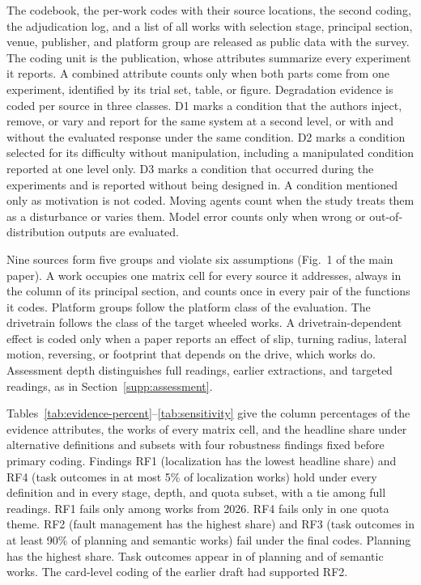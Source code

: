 \documentclass[journal]{IEEEtran}
\begin{document}
The codebook, the per-work codes with their source locations, the second coding, the adjudication log, and a list of all \CorpusCount{} works with selection stage, principal section, venue, publisher, and platform group are released as public data with the survey. The coding unit is the publication, whose attributes summarize every experiment it reports. A combined attribute counts only when both parts come from one experiment, identified by its trial set, table, or figure. Degradation evidence is coded per source in three classes. D1 marks a condition that the authors inject, remove, or vary and report for the same system at a second level, or with and without the evaluated response under the same condition. D2 marks a condition selected for its difficulty without manipulation, including a manipulated condition reported at one level only. D3 marks a condition that occurred during the experiments and is reported without being designed in. A condition mentioned only as motivation is not coded. Moving agents count when the study treats them as a disturbance or varies them. Model error counts only when wrong or out-of-distribution outputs are evaluated.

Nine sources form five groups and violate six assumptions (Fig.~1 of the main paper). A work occupies one matrix cell for every source it addresses, always in the column of its principal section, and counts once in every pair of the functions it codes. Platform groups follow the platform class of the evaluation. The drivetrain follows the class of the target wheeled works. A drivetrain-dependent effect is coded only when a paper reports an effect of slip, turning radius, lateral motion, reversing, or footprint that depends on the drive, which \DrivetrainEffectCount{} works do. Assessment depth distinguishes full readings, earlier extractions, and targeted readings, as in Section~\ref{supp:assessment}.

Tables~\ref{tab:evidence-percent}--\ref{tab:sensitivity} give the column percentages of the evidence attributes, the works of every matrix cell, and the headline share under alternative definitions and subsets with four robustness findings fixed before primary coding. Findings RF1 (localization has the lowest headline share) and RF4 (task outcomes in at most 5\% of localization works) hold under every definition and in every stage, depth, and quota subset, with a tie among full readings. RF1 fails only among works from 2026. RF4 fails only in one quota theme. RF2 (fault management has the highest share) and RF3 (task outcomes in at least 90\% of planning and semantic works) fail under the final codes. Planning has the highest share. Task outcomes appear in \PlnTaskCount{} of \PlnTechCount{} planning and \SemTaskCount{} of \SemTechCount{} semantic works. The card-level coding of the earlier draft had supported RF2.
\end{document}
